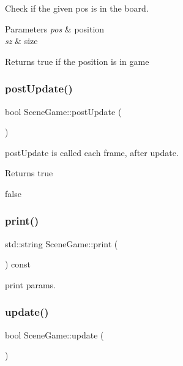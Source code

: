 Check if the given pos is in the board. 


\begin{DoxyParams}{Parameters}
{\em pos} & position \\
\hline
{\em sz} & size \\
\hline
\end{DoxyParams}
\begin{DoxyReturn}{Returns}
true if the position is in game 
\end{DoxyReturn}
\mbox{\label{class_scene_game_a074516c60084a30fea0eb34cbf0b57c9}} 
\subsubsection{\texorpdfstring{post\+Update()}{postUpdate()}}
{\footnotesize\ttfamily bool Scene\+Game\+::post\+Update (\begin{DoxyParamCaption}{ }\end{DoxyParamCaption})\hspace{0.3cm}{\ttfamily [virtual]}}



post\+Update is called each frame, after update. 

\begin{DoxyReturn}{Returns}
true 

false 
\end{DoxyReturn}
\mbox{\label{class_scene_game_ade3372481910abd46f43c214ec3b2a27}} 
\subsubsection{\texorpdfstring{print()}{print()}}
{\footnotesize\ttfamily std\+::string Scene\+Game\+::print (\begin{DoxyParamCaption}{ }\end{DoxyParamCaption}) const}

print params. \mbox{\label{class_scene_game_a5e23048e3ad8c6fde2d753ed7449e2d5}} 
\subsubsection{\texorpdfstring{update()}{update()}}
{\footnotesize\ttfamily bool Scene\+Game\+::update (\begin{DoxyParamCaption}{ }\end{DoxyParamCaption})\hspace{0.3cm}{\ttfamily [virtual]}}



